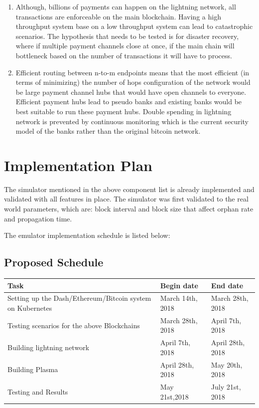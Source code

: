 \documentclass[journal,12pt,onecolumn,draftclsnofoot,]{IEEEtran}
\begin{document}
\begin{enumerate}[label=(\alph*)]
\begin{enumerate}
                \item Although, billions of payments can happen on the lightning
                    network, all transactions are enforceable on the main
                    blockchain. Having a high throughput system base on a low
                    throughput system can lead to catastrophic scenarios. The
                    hypothesis that needs to be tested is for disaster recovery,
                    where if multiple payment channels close at once, if the
                    main chain will bottleneck based on the number of
                    transactions it will have to process. 

                \item Efficient routing between n-to-m endpoints means that the
                    most efficient (in terms of minimizing) the number of hops
                    configuration of the network would be large payment channel
                    hubs that would have open channels to everyone. Efficient
                    payment hubs lead to pseudo banks and existing banks would
                    be best suitable to run these payment hubs. Double spending
                    in lightning network is prevented by continuous monitoring
                    which is the current security model of the banks rather than
                    the original bitcoin network.
            \end{enumerate}

    \end{enumerate}


\section{Implementation Plan}
The simulator mentioned in the above component list is already implemented and
validated with all features in place. The simulator was first validated to the
real world parameters, which are: block interval and block size that affect
orphan rate and propagation time.

The emulator implementation schedule is listed below:    

\subsection{Proposed Schedule}
\begin{tabular}{|p{5cm}||p{5cm}||p{5cm}|}
    \hline
    \textbf{Task} & \textbf{Begin date} & \textbf{End date} \\
    \hline
    Setting up the Dash/Ethereum/Bitcoin system on Kubernetes & March 14th, 2018 & March 28th, 2018 \\
    \hline
    Testing scenarios for the above Blockchains & March 28th, 2018 & April 7th, 2018 \\
    \hline
    Building lightning network & April 7th, 2018 & April 28th, 2018 \\
    \hline
    Building Plasma & April 28th, 2018 & May 20th, 2018 \\
    \hline
    Testing and Results & May 21st,2018 & July 21st, 2018 \\
    \hline
\end{tabular}
\end{document}
